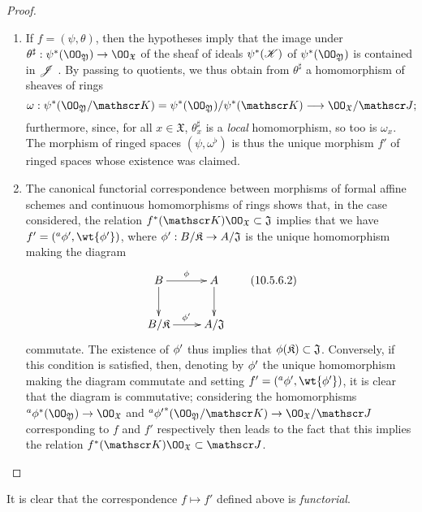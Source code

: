 \begin{proof}
\label{proof-1.10.5.6}
\medskip\noindent
\begin{enumerate}[label=(\roman*)]
  \item If $f=(\psi,\theta)$, then the hypotheses imply that the image under $\theta^\sharp:\psi^*(\OO_\mathfrak{Y})\to\OO_\mathfrak{X}$ of the sheaf of ideals $\psi^*(\mathscr{K})$ of $\psi^*(\OO_\mathfrak{Y})$ is contained in $\mathscr{J}$ .
    By passing to quotients, we thus obtain from $\theta^\sharp$ a homomorphism of sheaves of rings
    \[
      \omega:\psi^*(\OO_\mathfrak{Y}/\sh{K})=\psi^*(\OO_\mathfrak{Y})/\psi^*(\sh{K})\to\OO_\mathfrak{X}/\sh{J};
    \]
    furthermore, since, for all $x\in\mathfrak{X}$, $\theta_x^\sharp$ is a \emph{local} homomorphism, so too is $\omega_x$.
    The morphism of ringed spaces $(\psi,\omega^\flat)$ is thus  the unique morphism $f'$ of ringed spaces whose existence was claimed.
  \item The canonical functorial correspondence between morphisms of formal affine schemes and continuous homomorphisms of rings  shows that, in the case considered, the relation $f^*(\sh{K})\OO_\mathfrak{X}\subset\mathfrak{J}$ implies that we have $f'=({}^a\vphi',\wt{\vphi'})$, where $\vphi':B/\mathfrak{K}\to A/\mathfrak{J}$ is the unique homomorphism making the diagram
    \begin{equation*}
    \label{1.10.5.6.2}
      \xymatrix{
        B\ar[r]^\vphi\ar[d] &
        A\ar[d]\\
        B/\mathfrak{K}\ar[r]^{\vphi'} &
        A/\mathfrak{J}
      }
      \tag{10.5.6.2}
    \end{equation*}
    commutate.
    The existence of $\phi'$ thus implies that $\phi(\mathfrak{K})\subset\mathfrak{J}$.
    Conversely, if this condition is satisfied, then, denoting by $\phi'$ the unique homomorphism making the diagram  commutate and setting $f'=({}^a\vphi',\wt{\vphi'})$, it is clear that the diagram  is commutative; considering the homomorphisms ${}^a\vphi^*(\OO_\mathfrak{Y})\to\OO_\mathfrak{X}$ and ${}^a{\vphi'}^*(\OO_\mathfrak{Y}/\sh{K})\to\OO_\mathfrak{X}/\sh{J}$ corresponding to $f$ and $f'$ respectively then leads to the fact that this implies the relation $f^*(\sh{K})\OO_\mathfrak{X}\subset\sh{J}$.
\end{enumerate}
\end{proof}

It is clear that the correspondence $f\mapsto f'$ defined above is \emph{functorial}.

